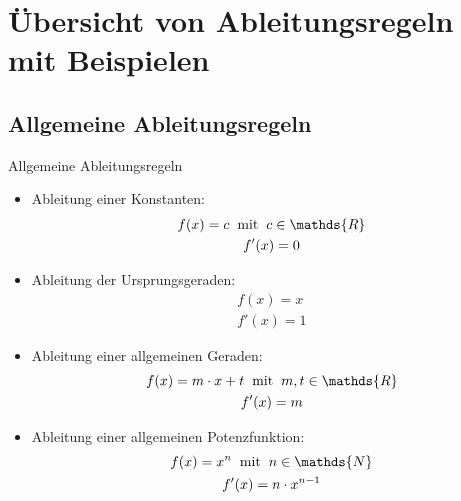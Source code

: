\section{Übersicht von Ableitungsregeln mit Beispielen} 
\subsection{Allgemeine Ableitungsregeln}
\begin{merke}{Allgemeine Ableitungsregeln}{}
\begin{multicols}{2}
\begin{itemize}
    \item Ableitung einer Konstanten:
    \begin{gather*} 
	f(x) = c \hspace{0.2cm}\text{mit} \hspace{0.2cm} c \in \mathds{R}\\ 
	f'(x) = 0
	\end{gather*}
    \item Ableitung der Ursprungsgeraden:
    \begin{gather*} 
	f(x) = x \\ 
	f'(x) = 1
	\end{gather*} 
     \item Ableitung einer allgemeinen Geraden:
    \begin{gather*} 
	f(x) = m\cdot x + t  \hspace{0.2cm}\text{mit} \hspace{0.2cm} m,t \in \mathds{R}\\ 
	f'(x) = m
	\end{gather*}
 \item Ableitung einer allgemeinen Potenzfunktion:
    \begin{gather*} 
	f(x) = x^n  \hspace{0.2cm}\text{mit} \hspace{0.2cm} n \in \mathds{N}\\ 
	f'(x) =n \cdot x^{n-1}
	\end{gather*}
\end{itemize}    
\end{multicols}
\end{merke}
